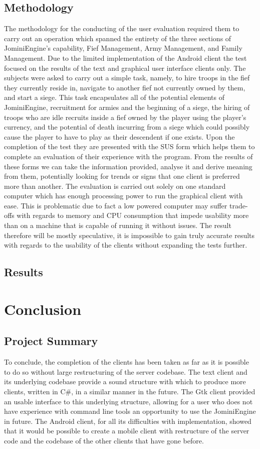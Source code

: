 \documentclass{article}
\begin{document}
\subsection{Methodology}
The methodology for the conducting of the user evaluation required them to carry out an operation which spanned the entirety of the three sections of JominiEngine’s capability, Fief Management, Army Management, and Family Management. Due to the limited implementation of the Android client the test focused on the results of the text and graphical user interface clients only. The subjects were asked to carry out a simple task, namely, to hire troops in the fief they currently reside in, navigate to another fief not currently owned by them, and start a siege. This task encapsulates all of the potential elements of JominiEngine, recruitment for armies and the beginning of a siege, the hiring of troops who are idle recruits inside a fief owned by the player using the player’s currency, and the potential of death incurring from a siege which could possibly cause the player to have to play as their descendent if one exists. Upon the completion of the test they are presented with the SUS form which helps them to complete an evaluation of their experience with the program. From the results of these forms we can take the information provided, analyse it and derive meaning from them, potentially looking for trends or signs that one client is preferred more than another. The evaluation is carried out solely on one standard computer which has enough processing power to run the graphical client with ease. This is problematic due to fact a low powered computer may suffer trade-offs with regards to memory and CPU consumption that impede usability more than on a machine that is capable of running it without issues. The result therefore will be mostly speculative, it is impossible to gain truly accurate results with regards to the usability of the clients without expanding the tests further.
\subsection{Results}
\section{Conclusion}
\subsection{Project Summary}
To conclude, the completion of the clients has been taken as far as it is possible to do so without large restructuring of the server codebase. The text client and its underlying codebase provide a sound structure with which to produce more clients, written in C\#, in a similar manner in the future. The Gtk client provided an usable interface to this underlying structure, allowing for a user who does not have experience with command line tools an opportunity to use the JominiEngine in future. The Android client, for all its difficulties with implementation, showed that it would be possible to create a mobile client with restructure of the server code and the codebase of the other clients that have gone before.
\end{document}
